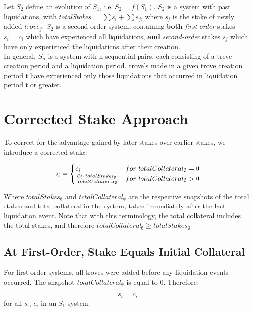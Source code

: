 \documentclass[reqno]{article}
\begin{document}
Let $S_2$ define an evolution of $S_1$, i.e. $S_2 = f(S_1)$. $S_2$ is a system with past liquidations, with \textit{totalStakes} $= \sum s_i + \sum s_j$, where $s_j$ is the stake of newly added $trove_j$. $S_2$ is a second-order system, containing \textbf{both} \textit{first-order} stakes $s_i = c_i$ which have experienced all liquidations, \textbf{and} \textit{second-order} stakes $s_j$ which have only experienced the liquidations after their creation.\\

In general, $S_n$ is a system with n sequential pairs, each consisting of a trove creation period and a liquidation period. trove's made in a given trove creation period t have experienced only those liquidations that occurred in liquidation period t or greater.

\section{Corrected Stake Approach}

To correct for the advantage gained by later stakes over earlier stakes, we introduce a corrected stake:

\begin{equation}
    s_i=
        \begin{cases} 
            c_i & for \;totalCollateral_\emptyset = 0\\
            \frac{\mathlarger{c_i} \cdot \; totalStakes_\emptyset} {\;totalCollateral_\emptyset} & for \;totalCollateral_\emptyset>0
        \end{cases}
\end{equation}

\bigskip
Where $totalStakes_\emptyset$ and $totalCollateral_\emptyset$ are the respective snapshots of the total stakes and total collateral in the system, taken immediately after the last liquidation event. Note that with this terminology, the total collateral includes the total stakes, and therefore $totalCollateral_\emptyset \ge totalStakes_\emptyset$

\subsection{At First-Order, Stake Equals Initial Collateral}

For first-order systems, all troves were added before any liquidation events occurred. The snapshot $totalCollateral_\emptyset$ is equal to 0. Therefore:

\begin{equation} 
    s_i=c_i
\end{equation}
for all $s_i$, $c_i$ in an $S_1$ system.
\end{document}

